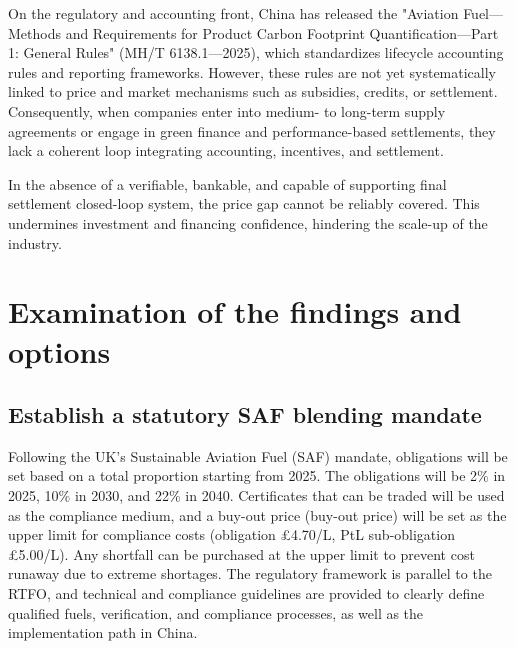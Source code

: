 \documentclass[a4paper,11pt]{article}
\begin{document}
On the regulatory and accounting front, China has released the "Aviation Fuel---Methods and Requirements for Product Carbon Footprint Quantification---Part 1: General Rules" (MH/T 6138.1---2025), which standardizes lifecycle accounting rules and reporting frameworks. However, these rules are not yet systematically linked to price and market mechanisms such as subsidies, credits, or settlement. Consequently, when companies enter into medium- to long-term supply agreements or engage in green finance and performance-based settlements, they lack a coherent loop integrating accounting, incentives, and settlement.

In the absence of a verifiable, bankable, and capable of supporting final settlement closed-loop system, the price gap cannot be reliably covered. This undermines investment and financing confidence, hindering the scale-up of the industry.


\section{Examination of the findings and options}

\subsection{Establish a statutory SAF blending mandate}
Following the UK's Sustainable Aviation Fuel (SAF) mandate, obligations will be set based on a total proportion starting from 2025. The obligations will be 2\% in 2025, 10\% in 2030, and 22\% in 2040. Certificates that can be traded will be used as the compliance medium, and a buy-out price (buy-out price) will be set as the upper limit for compliance costs (obligation £4.70/L, PtL sub-obligation £5.00/L). Any shortfall can be purchased at the upper limit to prevent cost runaway due to extreme shortages. The regulatory framework is parallel to the RTFO, and technical and compliance guidelines are provided to clearly define qualified fuels, verification, and compliance processes, as well as the implementation path in China.
\end{document}
